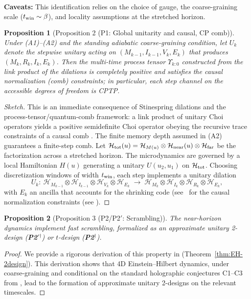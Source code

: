 \documentclass[a4paper,11pt]{article}
\newcommand{\condmark}{\ensuremath{^{\dagger}}}
\newcommand{\Ptwo}{\textbf{P2}\condmark}
\newcommand{\PtwoPrime}{\textbf{P2$'$}\condmark}
\theoremstyle{plain}
\newtheorem{proposition}{Proposition}
\theoremstyle{definition}
\theoremstyle{remark}
\begin{document}
\textbf{Caveats:} This identification relies on the choice of gauge, the coarse-graining scale ($t_{\rm win} \sim \beta$), and locality assumptions at the stretched horizon.



\begin{proposition}[Proposition 2 (P1: Global unitarity and causal, CP comb)]
\label{prop:P1-CP}
Under (A1)--(A2) and the standing adiabatic coarse-graining condition, let $U_k$ denote the stepwise unitary acting on $(M_{k-1},I_{k-1},V_k,E_k)$ that produces $(M_k,R_k,I_k,E_k)$.
Then the multi-time process tensor $\Upsilon_{k:0}$ constructed from the link product of the dilations is completely positive and
satisfies the causal normalization (comb) constraints; in particular, each step channel on the accessible degrees of freedom is CPTP.
\end{proposition}
\begin{proof}[Sketch]
This is an immediate consequence of Stinespring dilations and the process-tensor/quantum-comb framework: a link product of unitary
Choi operators yields a positive semidefinite Choi operator obeying the recursive trace constraints of a causal comb
\citep{Chiribella:2009, Pollock:2018, Petz:1986}. The finite memory depth assumed in (A2) guarantees a finite-step comb.
Let $\mathcal{H}_{\rm tot}(u)=\mathcal{H}_{M(u)}\otimes\mathcal{H}_{\rm near}(u)\otimes\mathcal{H}_{\rm far}$ be the factorization across a stretched horizon. The microdynamics are governed by a local Hamiltonian $H(u)$ generating a unitary $U(u_2,u_1)$ on $\mathcal{H}_{\rm tot}$. Choosing discretization windows of width $t_{\rm win}$, each step implements a unitary dilation
\begin{equation}
U_k:\ \mathcal{H}_{M_{k-1}}\otimes\mathcal{H}_{I_{k-1}}\otimes\mathcal{H}_{V_k}\otimes\mathcal{H}_{E_k}
\;\longrightarrow\;
\mathcal{H}_{M_k}\otimes\mathcal{H}_{I_k}\otimes\mathcal{H}_{R_k}\otimes\mathcal{H}_{E_k},
\end{equation}
with $E_k$ an ancilla that accounts for the shrinking code (see~ for the causal normalization constraints (see ).
\end{proof}

\begin{proposition}[Proposition 3 (P2/P2$'$: Scrambling)]
\label{thm:P2-scrambling}
\label{prop:P2-scrambling}
The near-horizon dynamics implement fast scrambling, formalized as an approximate unitary 2-design (\PtwoPrime) or $t$-design (\Ptwo).
\end{proposition}
\begin{proof}
We provide a rigorous derivation of this property in  (Theorem~\ref{thm:EH-2design}). This derivation shows that 4D Einstein--Hilbert dynamics, under coarse-graining and conditional on the standard holographic conjectures C1--C3 from , lead to the formation of approximate unitary 2-designs on the relevant timescales.
\end{proof}
\end{document}

